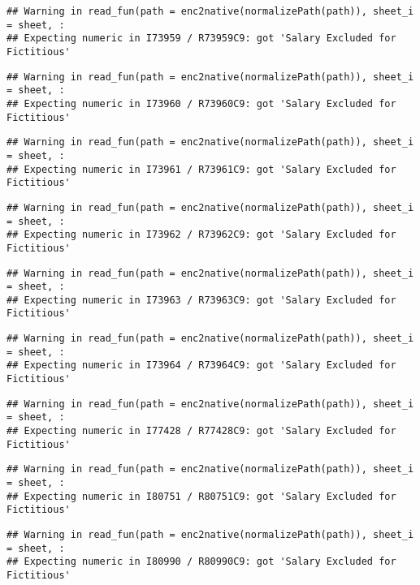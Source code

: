 \documentclass[
]{article}
\begin{document}
\begin{verbatim}
## Warning in read_fun(path = enc2native(normalizePath(path)), sheet_i = sheet, :
## Expecting numeric in I73959 / R73959C9: got 'Salary Excluded for Fictitious'
\end{verbatim}

\begin{verbatim}
## Warning in read_fun(path = enc2native(normalizePath(path)), sheet_i = sheet, :
## Expecting numeric in I73960 / R73960C9: got 'Salary Excluded for Fictitious'
\end{verbatim}

\begin{verbatim}
## Warning in read_fun(path = enc2native(normalizePath(path)), sheet_i = sheet, :
## Expecting numeric in I73961 / R73961C9: got 'Salary Excluded for Fictitious'
\end{verbatim}

\begin{verbatim}
## Warning in read_fun(path = enc2native(normalizePath(path)), sheet_i = sheet, :
## Expecting numeric in I73962 / R73962C9: got 'Salary Excluded for Fictitious'
\end{verbatim}

\begin{verbatim}
## Warning in read_fun(path = enc2native(normalizePath(path)), sheet_i = sheet, :
## Expecting numeric in I73963 / R73963C9: got 'Salary Excluded for Fictitious'
\end{verbatim}

\begin{verbatim}
## Warning in read_fun(path = enc2native(normalizePath(path)), sheet_i = sheet, :
## Expecting numeric in I73964 / R73964C9: got 'Salary Excluded for Fictitious'
\end{verbatim}

\begin{verbatim}
## Warning in read_fun(path = enc2native(normalizePath(path)), sheet_i = sheet, :
## Expecting numeric in I77428 / R77428C9: got 'Salary Excluded for Fictitious'
\end{verbatim}

\begin{verbatim}
## Warning in read_fun(path = enc2native(normalizePath(path)), sheet_i = sheet, :
## Expecting numeric in I80751 / R80751C9: got 'Salary Excluded for Fictitious'
\end{verbatim}

\begin{verbatim}
## Warning in read_fun(path = enc2native(normalizePath(path)), sheet_i = sheet, :
## Expecting numeric in I80990 / R80990C9: got 'Salary Excluded for Fictitious'
\end{verbatim}
\end{document}
